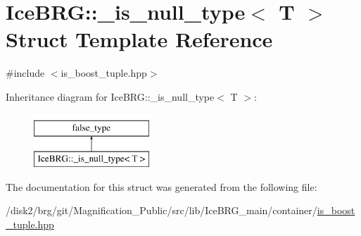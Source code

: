 \hypertarget{structIceBRG_1_1__is__null__type}{}\section{Ice\+B\+R\+G\+:\+:\+\_\+is\+\_\+null\+\_\+type$<$ T $>$ Struct Template Reference}
\label{structIceBRG_1_1__is__null__type}


{\ttfamily \#include $<$is\+\_\+boost\+\_\+tuple.\+hpp$>$}

Inheritance diagram for Ice\+B\+R\+G\+:\+:\+\_\+is\+\_\+null\+\_\+type$<$ T $>$\+:\begin{figure}[H]
\begin{center}
\leavevmode
\includegraphics[height=2.000000cm]{structIceBRG_1_1__is__null__type}
\end{center}
\end{figure}


The documentation for this struct was generated from the following file\+:\begin{DoxyCompactItemize}
\item 
/disk2/brg/git/\+Magnification\+\_\+\+Public/src/lib/\+Ice\+B\+R\+G\+\_\+main/container/\hyperlink{is__boost__tuple_8hpp}{is\+\_\+boost\+\_\+tuple.\+hpp}\end{DoxyCompactItemize}

